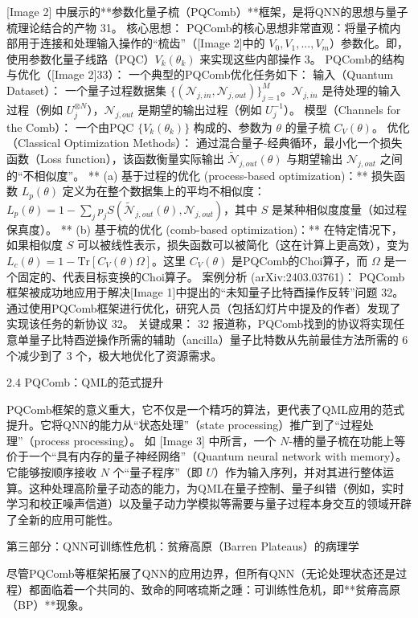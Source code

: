 \documentclass[12pt,a4paper]{article}
\begin{document}
[Image 2] 中展示的**参数化量子梳（PQComb）**框架，是将QNN的思想与量子梳理论结合的产物 31。
核心思想：
PQComb的核心思想非常直观：将量子梳内部用于连接和处理输入操作的“梳齿”（[Image 2]中的 $V_0, V_1,..., V_m$）参数化。即，使用参数化量子线路（PQC）$V_k(\theta_k)$ 来实现这些内部操作 3。
PQComb的结构与优化（[Image 2]33）：
一个典型的PQComb优化任务如下：
输入（Quantum Dataset）： 一个量子过程数据集 $\{ (\mathcal{N}_{j,in}, \mathcal{N}_{j,out}) \}_{j=1}^M$。$\mathcal{N}_{j,in}$ 是待处理的输入过程（例如 $U_j^{\otimes N}$），$\mathcal{N}_{j,out}$ 是期望的输出过程（例如 $U_j^{-1}$）。
模型（Channels for the Comb）： 一个由PQC $\{ V_k(\theta_k) \}$ 构成的、参数为 $\theta$ 的量子梳 $C_V(\theta)$。
优化（Classical Optimization Methods）： 通过混合量子-经典循环，最小化一个损失函数（Loss function），该函数衡量实际输出 $\tilde{\mathcal{N}}_{j,out}(\theta)$ 与期望输出 $\mathcal{N}_{j,out}$ 之间的“不相似度”。
** (a) 基于过程的优化 (process-based optimization)：** 损失函数 $L_p(\theta)$ 定义为在整个数据集上的平均不相似度：$L_p(\theta) = 1 - \sum_j p_j S(\tilde{\mathcal{N}}_{j,out}(\theta), \mathcal{N}_{j,out})$，其中 $S$ 是某种相似度度量（如过程保真度）。
** (b) 基于梳的优化 (comb-based optimization)：** 在特定情况下，如果相似度 $S$ 可以被线性表示，损失函数可以被简化（这在计算上更高效），变为 $L_c(\theta) = 1 - \text{Tr}[C_V(\theta)\Omega]$。这里 $C_V(\theta)$ 是PQComb的Choi算子，而 $\Omega$ 是一个固定的、代表目标变换的Choi算子。
案例分析 (arXiv:2403.03761)：
PQComb框架被成功地应用于解决[Image 1]中提出的“未知量子比特酉操作反转”问题 32。通过使用PQComb框架进行优化，研究人员（包括幻灯片中提及的作者）发现了实现该任务的新协议 32。
关键成果： 32 报道称，PQComb找到的协议将实现任意单量子比特酉逆操作所需的辅助（ancilla）量子比特数从先前最佳方法所需的 6 个减少到了 3 个，极大地优化了资源需求。

2.4 PQComb：QML的范式提升

PQComb框架的意义重大，它不仅是一个精巧的算法，更代表了QML应用的范式提升。它将QNN的能力从“状态处理”（state processing）推广到了“过程处理”（process processing）。
如 [Image 3] 中所言，一个 $N$-槽的量子梳在功能上等价于一个“具有内存的量子神经网络”（Quantum neural network with memory）。它能够按顺序接收 $N$ 个“量子程序”（即 $U$）作为输入序列，并对其进行整体运算。这种处理高阶量子动态的能力，为QML在量子控制、量子纠错（例如，实时学习和校正噪声信道）以及量子动力学模拟等需要与量子过程本身交互的领域开辟了全新的应用可能性。

第三部分：QNN可训练性危机：贫瘠高原（Barren Plateaus）的病理学

尽管PQComb等框架拓展了QNN的应用边界，但所有QNN（无论处理状态还是过程）都面临着一个共同的、致命的阿喀琉斯之踵：可训练性危机，即**贫瘠高原（BP）**现象。
\end{document}
